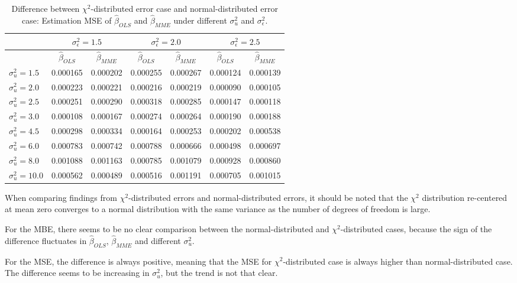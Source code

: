 \documentclass{article}
\begin{document}
\begin{table}[ht]
    \centering
    \caption{Difference between $\chi^2$-distributed error case and normal-distributed error case: Estimation MSE of $\hat{\beta}_{OLS}$ and $\hat{\beta}_{MME}$ under different $\sigma^2_u$ and $\sigma^2_\epsilon$.}
    \label{Tab:MSE_diff_chi_normal}
    \begin{tabular}[t]{lcccccc}
        \hline
        &\multicolumn{2}{c}{$\sigma^2_\epsilon=1.5$}&\multicolumn{2}{c}{$\sigma^2_\epsilon=2.0$}&\multicolumn{2}{c}{$\sigma^2_\epsilon=2.5$}\\
        \hline
        &$\hat{\beta}_{OLS}$&$\hat{\beta}_{MME}$&$\hat{\beta}_{OLS}$&$\hat{\beta}_{MME}$&$\hat{\beta}_{OLS}$&$\hat{\beta}_{MME}$\\
        \hline
        $\sigma^2_u = 1.5$&0.000165&0.000202&0.000255&0.000267&0.000124&0.000139\\
        $\sigma^2_u = 2.0$&0.000223&0.000221&0.000216&0.000219&0.000090&0.000105\\
        $\sigma^2_u = 2.5$&0.000251&0.000290&0.000318&0.000285&0.000147&0.000118\\
        $\sigma^2_u = 3.0$&0.000108&0.000167&0.000274&0.000264&0.000190&0.000188\\
        $\sigma^2_u = 4.5$&0.000298&0.000334&0.000164&0.000253&0.000202&0.000538\\
        $\sigma^2_u = 6.0$&0.000783&0.000742&0.000788&0.000666&0.000498&0.000697\\
        $\sigma^2_u = 8.0$&0.001088&0.001163&0.000785&0.001079&0.000928&0.000860\\
        $\sigma^2_u = 10.0$&0.000562&0.000489&0.000516&0.001191&0.000705&0.001015\\
        \hline
    \end{tabular}
\end{table}

When comparing findings from $\chi^2$-distributed errors and normal-distributed errors, it should be noted that the $\chi^2$ distribution re-centered at mean zero converges to a normal distribution with the same variance as the number of degrees of freedom is large.

For the MBE, there seems to be no clear comparison between the normal-distributed and $\chi^2$-distributed cases,
because the sign of the difference fluctuates in $\hat{\beta}_{OLS}$, $\hat{\beta}_{MME}$ and different $\sigma^2_u$.

For the MSE, the difference is always positive, meaning that the MSE for $\chi^2$-distributed case is always higher than normal-distributed case.
The difference seems to be increasing in $\sigma^2_u$, but the trend is not that clear. 
\end{document}
